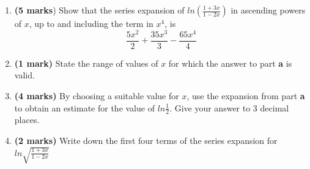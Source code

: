 \documentclass[
  a4paper,
]{report}
\begin{document}
\begin{enumerate}
\def\labelenumi{\alph{enumi}.}
\item
  \textbf{(5 marks}) Show that the series expansion of
  \(ln{\left(\frac{1+3x}{1-2x}\right)}\) in ascending powers of \(x\),
  up to and including the term in \(x^4\), is
  \[\frac{5x^2}{2}+\frac{35x^3}{3}-\frac{65x^4}{4}\]
\item
  \textbf{(1 mark)} State the range of values of \(x\) for which the
  answer to part \textbf{a} is valid.
\item
  \textbf{(4 marks)} By choosing a suitable value for \(x\), use the
  expansion from part \textbf{a} to obtain an estimate for the value of
  \(ln{\frac{1}{2}}\). Give your answer to 3 decimal places.
\item
  \textbf{(2 marks)} Write down the first four terms of the series
  expansion for \(ln{\sqrt{\frac{1+3x}{1-2x}}}\)
\end{enumerate}
\end{document}
